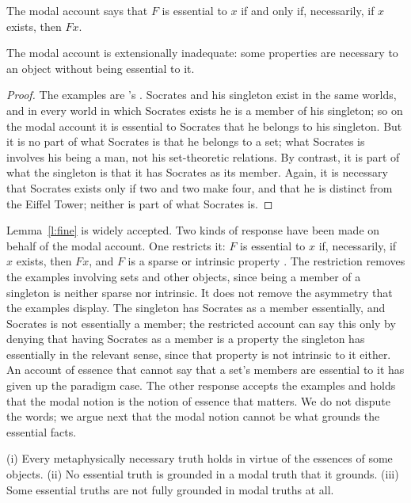 \documentclass{situationist-preprint}
\begin{document}
The modal account says that $F$ is essential to $x$ if and only if, necessarily, if $x$ exists, then $Fx$.

\begin{lemma}\label{l:fine}
The modal account is extensionally inadequate: some properties are necessary to an object without being essential to it.
\end{lemma}

\begin{proof}
The examples are \citeauthor{Fine1994}'s \citep{Fine1994}. Socrates and his singleton exist in the same worlds, and in every world in which Socrates exists he is a member of his singleton; so on the modal account it is essential to Socrates that he belongs to his singleton. But it is no part of what Socrates is that he belongs to a set; what Socrates is involves his being a man, not his set-theoretic relations. By contrast, it is part of what the singleton is that it has Socrates as its member. Again, it is necessary that Socrates exists only if two and two make four, and that he is distinct from the Eiffel Tower; neither is part of what Socrates is.
\end{proof}

Lemma~\ref{l:fine} is widely accepted. Two kinds of response have been made on behalf of the modal account. One restricts it: $F$ is essential to $x$ if, necessarily, if $x$ exists, then $Fx$, and $F$ is a sparse or intrinsic property \citep{Wildman2013}. The restriction removes the examples involving sets and other objects, since being a member of a singleton is neither sparse nor intrinsic. It does not remove the asymmetry that the examples display. The singleton has Socrates as a member essentially, and Socrates is not essentially a member; the restricted account can say this only by denying that having Socrates as a member is a property the singleton has essentially in the relevant sense, since that property is not intrinsic to it either. An account of essence that cannot say that a set's members are essential to it has given up the paradigm case. The other response accepts the examples and holds that the modal notion is the notion of essence that matters. We do not dispute the words; we argue next that the modal notion cannot be what grounds the essential facts.

\begin{theorem}\label{t:priority}
(i) Every metaphysically necessary truth holds in virtue of the essences of some objects. (ii) No essential truth is grounded in a modal truth that it grounds. (iii) Some essential truths are not fully grounded in modal truths at all.
\end{theorem}
\end{document}
